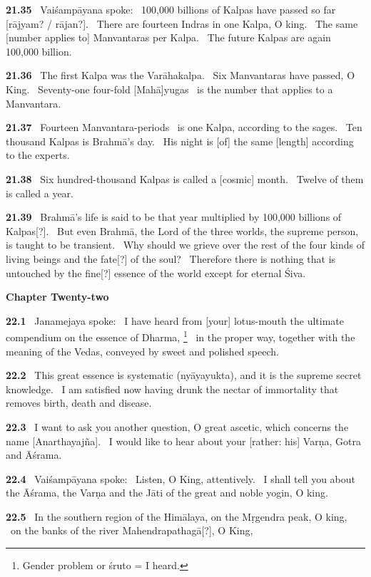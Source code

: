 \documentclass{article}
\begin{document}
\textbf{21.35}%
\ Vaiśampāyana spoke:%
\ 100,000 billions of Kalpas have passed so far [rājyam? / rājan?].%
\ There are fourteen Indras in one Kalpa, O king.%
\ The same [number applies to] Manvantaras per Kalpa.%
\ The future Kalpas are again 100,000 billion.%


\textbf{21.36}%
\ The first Kalpa was the Varāhakalpa.%
\ Six Manvantaras have passed, O King.%
\ Seventy-one four-fold [Mahā]yugas%
\ is the number that applies to a Manvantara.%


\textbf{21.37}%
\ Fourteen Manvantara-periods%
\ is one Kalpa, according to the sages.%
\ Ten thousand Kalpas is Brahmā's day.%
\ His night is [of] the same [length] according to the experts.%


\textbf{21.38}%
\ Six hundred-thousand Kalpas is called a [cosmic] month.%
\ Twelve of them is called a year.%


\textbf{21.39}%
\ Brahmā's life is said to be that year multiplied by 100,000 billions of Kalpas[?].%
\ But even Brahmā, the Lord of the three worlds, the supreme person, is taught to be transient.%
\ Why should we grieve over the rest of the four kinds of living beings and the fate[?] of the soul?%
\ Therefore there is nothing that is untouched by the fine[?] essence of the world except for eternal Śiva.%
\vfill\pagebreak\begin{center}{\large\textbf{ Chapter Twenty-two 
}}\end{center}


\textbf{22.1}%
\ Janamejaya spoke:%
\ I have heard from [your] lotus-mouth the ultimate compendium on the essence of Dharma,%
\footnote{Gender problem or śruto = I heard. }%
\ in the proper way, together with the meaning of the Vedas, conveyed by sweet and polished speech.%


\textbf{22.2}%
\ This great essence is systematic (nyāyayukta), and it is the supreme secret knowledge.%
\ I am satisfied now having drunk the nectar of immortality that removes birth, death and disease.%


\textbf{22.3}%
\ I want to ask you another question, O great ascetic, which concerns the name [Anarthayajña].%
\ I would like to hear about your [rather: his] Varṇa, Gotra and Āśrama.%


\textbf{22.4}%
\ Vaiśampāyana spoke:%
\ Listen, O King, attentively.%
\ I shall tell you about the Āśrama, the Varṇa and the Jāti of the great and noble yogin, O king.%


\textbf{22.5}%
\ In the southern region of the Himālaya, on the Mṛgendra peak, O king,%
\ on the banks of the river Mahendrapathagā[?], O King,%
\end{document}
